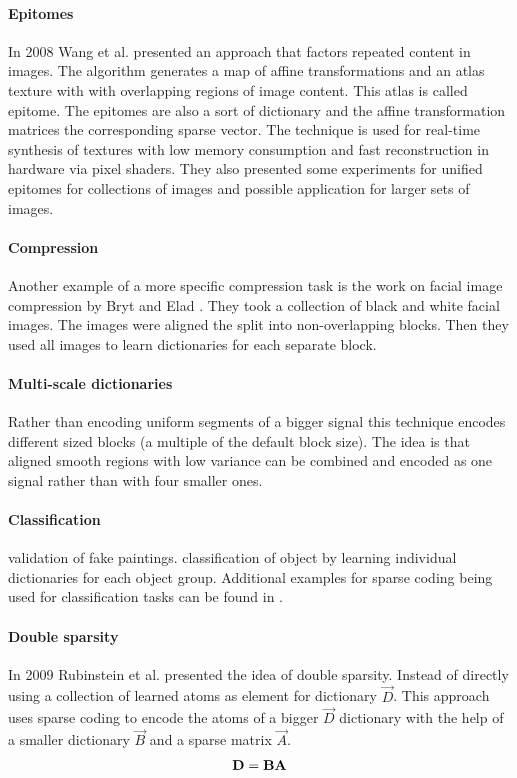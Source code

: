 \paragraph{Epitomes} In 2008 Wang et al.\cite{Wang2008a} presented
an approach that factors repeated content in images. The algorithm generates 
a map of affine transformations and an atlas texture with with overlapping
regions of image content. This atlas is called epitome. The epitomes are also a
sort of dictionary and the affine transformation matrices 
the corresponding sparse vector. The technique is used for real-time synthesis
of textures with low memory consumption and  fast reconstruction in hardware via
pixel shaders. They also presented some experiments for unified epitomes for
collections of images and possible application for larger sets of images. 

\paragraph{Compression} \cite{Lewicki1999,Murray2006}  
Another example of a more specific compression task is the
work on facial image compression by Bryt and Elad \cite{Bryt2008}. 
They took a collection of black and white facial images. The images were aligned
the split into non-overlapping blocks. Then they used all images to learn 
dictionaries for each separate block. 

\paragraph{Multi-scale dictionaries}
Rather than encoding uniform segments of a bigger signal this technique
encodes different sized blocks (a multiple of the default block size). The
idea is that aligned smooth regions with low variance can be combined
and encoded as one signal rather than with four smaller ones.\cite{Mairal2007}

\paragraph{Classification} \cite{?} validation of fake paintings. 
\cite{?} classification of object by learning individual dictionaries for each
object group. Additional examples for sparse coding  being used for
classification tasks can be found in
\cite{Grosse2007,Mairal2008,Mairal2008b,Bar2009}.

\paragraph{Double sparsity}
In 2009 Rubinstein et al.\cite{Rubinstein2009} presented the idea of double
sparsity. Instead of directly using a collection of learned atoms as element for
dictionary $\vec{D}$. This approach uses sparse coding to encode the atoms of a
bigger $\vec{D}$ dictionary with the help of a smaller dictionary $\vec{B}$ and
a sparse matrix $\vec{A}$. 
\begin{align*}
\boldsymbol{\mathrm{D}}=\boldsymbol{\mathrm{B}}\boldsymbol{\mathrm{A}}
\end{align*}

